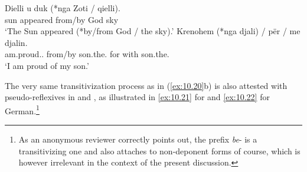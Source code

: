 \documentclass[output=paper]{langsci/langscibook}
\begin{document}
\ea\label{ex:10.19} 
    \ea
	\gll    Dielli u duk (*nga  Zoti / qielli).\\
    sun \Nact{} appeared \hphantom{(*}from/by God {} sky\\
    \glt    ‘The Sun appeared (*by/from God / the sky).’
    \ex
	\gll    Krenohem (*nga djali) / për / me djalin.\\
            am.proud.\Prs.\Nact{} \hphantom{(*}from/by son.the.\Nom{} {} for {} with son.the.\Acc\\
    \glt    ‘I am proud of my son.’
    \z
\ex \label{ex:10.20} 
    \z
\z

The very same transitivization process as in (\ref{ex:10.20}b) is also
attested with pseudo-reflexives in  and , as illustrated in
\eqref{ex:10.21} for  and \eqref{ex:10.22} for
German.\footnote{As an anonymous reviewer correctly points out, the 
prefix \emph{be}- is a transitivizing one and also attaches to non-deponent
forms of course, which is however irrelevant in the context of the present
discussion.}
\end{document}
